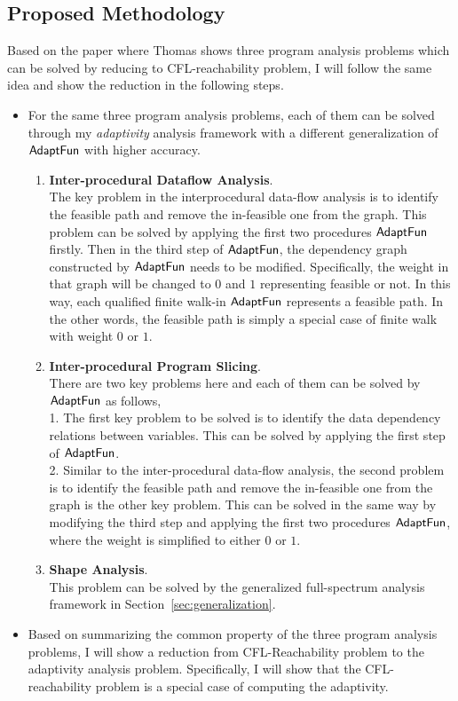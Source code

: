 \subsection{Proposed Methodology}
\label{subsec:cfl-methodology}
Based on the paper\cite{Reps98} where Thomas shows 
three program analysis problems 
which can be solved by reducing to CFL-reachability problem, I will follow the same idea and show the reduction
in the following steps.
\begin{itemize}
 \item For the same three program analysis problems, each of them 
 can be solved through my \emph{adaptivity} analysis framework with 
 a different generalization of $\textsf{AdaptFun}$ with higher accuracy.
 \begin{enumerate}
 \item \textbf{Inter-procedural Dataflow Analysis}.
 \\
 The key problem in the interprocedural data-flow analysis is to identify the feasible path and remove 
 the in-feasible one from the graph.
 This problem can be solved by applying the first two procedures $\textsf{AdaptFun}$ firstly.
 Then in the third step of  $\textsf{AdaptFun}$, the dependency graph constructed by $\textsf{AdaptFun}$ needs to be modified.
 Specifically, the weight in that graph will be changed to $0$ and $1$ 
 representing feasible or not. 
 In this way, each qualified finite walk-in 
 $\textsf{AdaptFun}$ represents a feasible path.
In the other words, the feasible path is simply a special case of finite walk 
 with weight $0$ or $1$.
 \item \textbf{Inter-procedural Program Slicing}.
 \\
 There are two key problems here and each of them can be solved by $\textsf{AdaptFun}$ as follows,
 \\ 
 1. The first key problem to be solved is to identify the data dependency relations between variables. 
 This can be solved by applying the first step of $\textsf{AdaptFun}$.
 \\
 2. Similar to the inter-procedural data-flow analysis, 
 the second problem is to identify the feasible path and remove 
 the in-feasible one from the graph is the other key problem. 
 This can be solved in the same way by modifying the third step and applying the first two procedures $\textsf{AdaptFun}$,
 where the weight is simplified to either $0$ or $1$.
 \item \textbf{Shape Analysis}.
 \\
 This problem can be solved by the generalized full-spectrum analysis framework in Section~\ref{sec:generalization}.
 \end{enumerate}
 \item Based on summarizing the common property of the three program analysis problems,
 I will show a reduction from CFL-Reachability problem to the 
 adaptivity analysis problem.
 Specifically, I will show that the CFL-reachability problem is a special case of 
 computing the adaptivity. 
\end{itemize}
